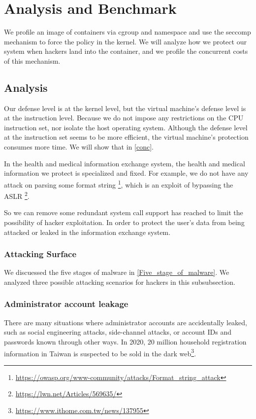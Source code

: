\section{Analysis and Benchmark}

We profile an image of containers via cgroup and namespace
and use the seccomp mechanism to force the policy in the kernel.
We will analyze how we protect our system when hackers land
into the container, and we profile the concurrent costs of this
mechanism.

\subsection{Analysis}
Our defense level is at the kernel level, but the virtual machine's
defense level is at the instruction level. Because we do not impose any
restrictions on the CPU instruction set, nor isolate the host operating system.
Although the defense level at the instruction set seems to be more efficient,
the virtual machine's protection consumes more time. We will show that in \ref{conc}.

In the health and medical information exchange system, the health and
medical information we protect is specialized and fixed. For example,
we do not have any attack on parsing some format string
\footnote{\url{https://owasp.org/www-community/attacks/Format_string_attack}},
which is an exploit of bypassing the ASLR \footnote{\url{https://lwn.net/Articles/569635/}}.

So we can remove some redundant system call support has reached to
limit the possibility of hacker exploitation. In order to protect
the user's data from being attacked or leaked in the information exchange system.

\subsubsection{Attacking Surface}
We discuessed the five stages of malware in \ref{Five_stage_of_malware}. We analyzed
three possible attacking scenarios for hackers in this subsubsection.

\subsubsection{Administrator account leakage}
There are many situations where administrator accounts are accidentally
leaked, such as social engineering attacks, side-channel attacks,
or account IDs and passwords known through other ways.
In 2020, 20 million household registration information in Taiwan is
suspected to be sold in the dark web\footnote{\url{https://www.ithome.com.tw/news/137955}}.

